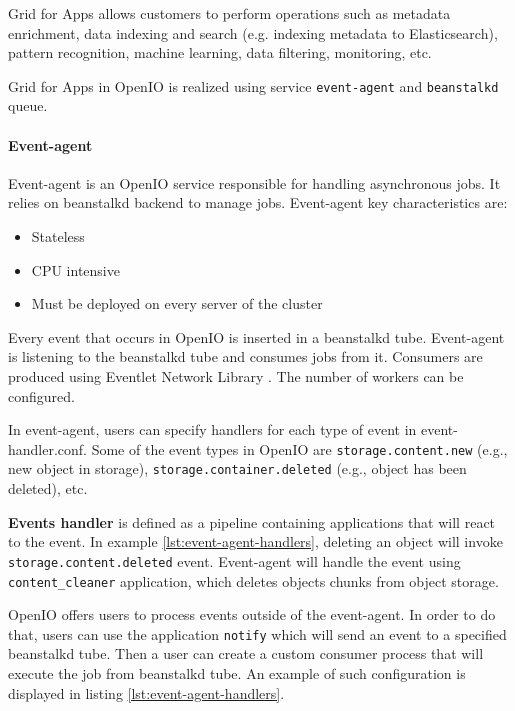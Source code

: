     Grid for Apps allows customers to perform operations such as metadata enrichment, data indexing and search (e.g. indexing metadata to Elasticsearch), pattern recognition, machine learning, data filtering, monitoring, etc\cite{oioNextGen}.

    Grid for Apps in OpenIO is realized using service \texttt{event-agent} and \texttt{beanstalkd} queue.

    \paragraph{Event-agent}\label{sec:oioEvent-Agent}
    Event-agent is an OpenIO service responsible for handling asynchronous jobs. It relies on beanstalkd backend to manage jobs. Event-agent key characteristics are\cite{oioSdsServices}:
    \begin{itemize}
        \item Stateless
        \item CPU intensive
        \item Must be deployed on every server of the cluster
    \end{itemize}

    Every event that occurs in OpenIO is inserted in a beanstalkd tube. Event-agent is listening to the beanstalkd tube and consumes jobs from it. Consumers are produced using Eventlet Network Library \cite{oioEventlet}. The number of workers can be configured.

    In event-agent, users can specify handlers for each type of event in event-handler.conf.
    Some of the event types in OpenIO are \texttt{storage.content.new} (e.g., new object in storage), \texttt{storage.container.deleted} (e.g., object has been deleted), etc.

    \textbf{Events handler} is defined as a pipeline containing applications that will react to the event. In example \ref{lst:event-agent-handlers}, deleting an object will invoke \texttt{storage.content.deleted} event. Event-agent will handle the event using \texttt{content\_cleaner} application, which deletes objects chunks from object storage.

    OpenIO offers users to process events outside of the event-agent. In order to do that, users can use the application \texttt{notify} which will send an event to a specified beanstalkd tube. Then a user can create a custom consumer process that will execute the job from beanstalkd tube. An example of such configuration is displayed in listing \ref{lst:event-agent-handlers}.

